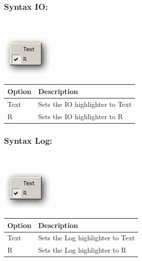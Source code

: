 \hypertarget{menu_view_r_rterm_syntax_IO}{}
\subsubsection{Syntax IO:}\\

\includegraphics[scale=0.50]{./res/menu_r_rterm_syntax.png}\\

\begin{scriptsize}\begin{tabularx}{\textwidth}{>{\hsize=0.3\hsize}X>{\hsize=0.7\hsize}X}\\
    \hline
    \textbf{Option} & \textbf{Description} \\
    \hline
    Text & Sets the IO highlighter to Text \\
    R & Sets the IO highlighter to R \\
    \hline
  \end{tabularx}\end{scriptsize}


\hypertarget{menu_view_r_rterm_syntax_Log}{}
\subsubsection{Syntax Log:}\\

\includegraphics[scale=0.50]{./res/menu_r_rterm_syntax.png}\\

\begin{scriptsize}\begin{tabularx}{\textwidth}{>{\hsize=0.3\hsize}X>{\hsize=0.7\hsize}X}\\
    \hline
    \textbf{Option} & \textbf{Description} \\
    \hline
    Text & Sets the Log highlighter to Text \\
    R & Sets the Log highlighter to R \\
    \hline
  \end{tabularx}\end{scriptsize}



